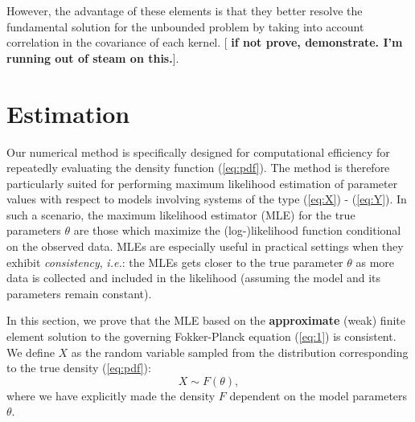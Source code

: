 \documentclass[10pt]{article}
\begin{document}
However, the advantage of these elements is that they better resolve
the fundamental solution for the unbounded problem by taking into
account correlation in the covariance of each kernel.
[\textbf{\color{red} if not prove, demonstrate. I'm running out of
  steam on this.}].

\section{Estimation}
Our numerical method is specifically designed for computational
efficiency for repeatedly evaluating the density function
(\ref{eq:pdf}). The method is therefore particularly suited for
performing maximum likelihood estimation of parameter values with
respect to models involving systems of the type (\ref{eq:X}) -
(\ref{eq:Y}). In such a scenario, the maximum likelihood estimator
(MLE) for the true parameters $\theta$ are those which maximize the
(log-)likelihood function conditional on the observed data. MLEs are
especially useful in practical settings when they exhibit
\textit{consistency}, \textit{i.e.}: the MLEs gets closer to the true
parameter $\theta$ as more data is collected and included in the
likelihood (assuming the model and its parameters remain constant).

In this section, we prove that the MLE based on the
\textbf{approximate} (weak) finite element solution to the governing
Fokker-Planck equation (\ref{eq:1}) is consistent. We define $X$ as
the random variable sampled from the distribution corresponding to the
true density (\ref{eq:pdf}):
\[
  X \sim F(\theta),
\]
where we have explicitly made the density $F$ dependent on the model
parameters $\theta$.
\end{document}
